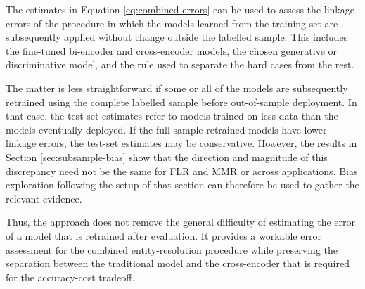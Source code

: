 The estimates in Equation \eqref{eq:combined-errors} can be used to assess the linkage
errors of the procedure in which the models learned from the training set are subsequently
applied without change outside the labelled sample. This includes the fine-tuned
bi-encoder and cross-encoder models, the chosen generative or discriminative model, and
the rule used to separate the hard cases from the rest.

The matter is less straightforward if some or all of the models are subsequently retrained
using the complete labelled sample before out-of-sample deployment. In that case, the
test-set estimates refer to models trained on less data than the models eventually deployed.
If the full-sample retrained models have lower linkage errors, the test-set estimates may be
conservative. However, the results in Section \ref{sec:subsample-bias} show that the
direction and magnitude of this discrepancy need not be the same for FLR and MMR or
across applications. Bias exploration following the setup of that section can therefore be
used to gather the relevant evidence.

Thus, the approach does not remove the general difficulty of estimating the error of a
model that is retrained after evaluation. It provides a workable error assessment for the
combined entity-resolution procedure while preserving the separation between the
traditional model and the cross-encoder that is required for the accuracy-cost tradeoff.

